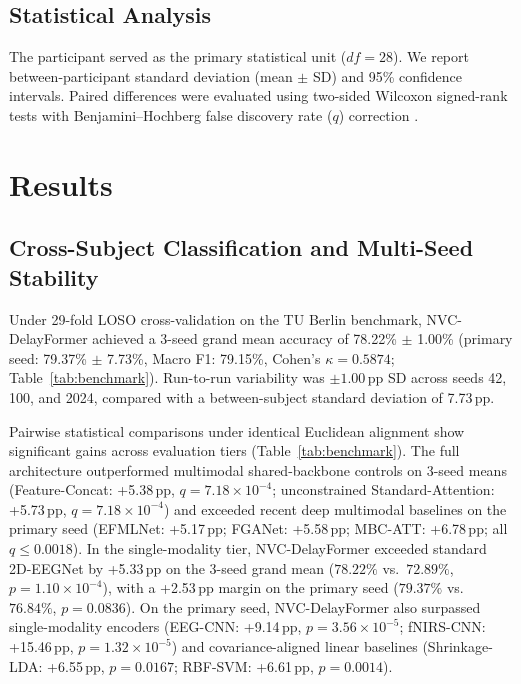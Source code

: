 \documentclass[journal]{IEEEtran}
\begin{document}
\subsection{Statistical Analysis}
The participant served as the primary statistical unit ($df=28$). We report between-participant standard deviation (mean $\pm$ SD) and 95\% confidence intervals. Paired differences were evaluated using two-sided Wilcoxon signed-rank tests with Benjamini--Hochberg false discovery rate ($q$) correction \cite{benjamini1995controlling}.

\section{Results}
\label{sec:results}
\subsection{Cross-Subject Classification and Multi-Seed Stability}

Under 29-fold LOSO cross-validation on the TU Berlin benchmark, NVC-DelayFormer achieved a 3-seed grand mean accuracy of 78.22\% $\pm$ 1.00\% (primary seed: 79.37\% $\pm$ 7.73\%, Macro F1: 79.15\%, Cohen's $\kappa = 0.5874$; Table~\ref{tab:benchmark}). Run-to-run variability was $\pm 1.00$\,pp SD across seeds 42, 100, and 2024, compared with a between-subject standard deviation of 7.73\,pp.

Pairwise statistical comparisons under identical Euclidean alignment show significant gains across evaluation tiers (Table~\ref{tab:benchmark}). The full architecture outperformed multimodal shared-backbone controls on 3-seed means (Feature-Concat: +5.38\,pp, $q = 7.18\times 10^{-4}$; unconstrained Standard-Attention: +5.73\,pp, $q = 7.18\times 10^{-4}$) and exceeded recent deep multimodal baselines on the primary seed (EFMLNet: +5.17\,pp; FGANet: +5.58\,pp; MBC-ATT: +6.78\,pp; all $q \le 0.0018$). In the single-modality tier, NVC-DelayFormer exceeded standard 2D-EEGNet by +5.33\,pp on the 3-seed grand mean ($78.22\%$ vs.\ $72.89\%$, $p = 1.10\times 10^{-4}$), with a +2.53\,pp margin on the primary seed ($79.37\%$ vs.\ $76.84\%$, $p = 0.0836$). On the primary seed, NVC-DelayFormer also surpassed single-modality encoders (EEG-CNN: +9.14\,pp, $p = 3.56\times 10^{-5}$; fNIRS-CNN: +15.46\,pp, $p = 1.32\times 10^{-5}$) and covariance-aligned linear baselines (Shrinkage-LDA: +6.55\,pp, $p = 0.0167$; RBF-SVM: +6.61\,pp, $p = 0.0014$).
\end{document}
